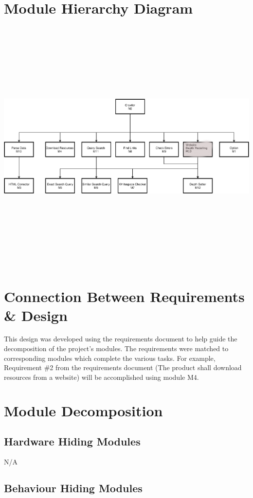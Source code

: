 \documentclass[titlepage]{article}
\begin{document}
\section{Module Hierarchy Diagram}
\includegraphics[width=19cm, height=13cm]{UsesDiagrams}


\section{Connection Between Requirements \& Design}

This design was developed using the requirements document to help guide the decomposition of the project's modules. The requirements were matched to corresponding modules which complete the various tasks. For example, Requirement \#2 from the requirements document (The product shall download resources from a website) will be accomplished using module M4.


\section{Module Decomposition}
\subsection{Hardware Hiding Modules}
N/A
\subsection{Behaviour Hiding Modules}
\end{document}
